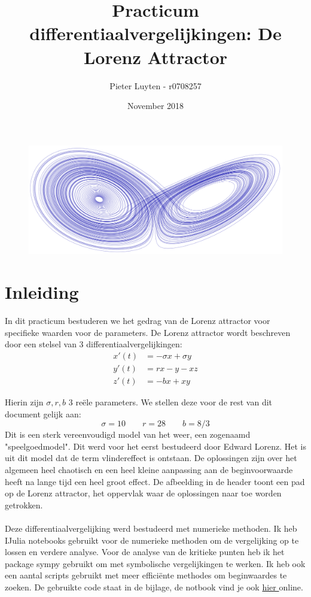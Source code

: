 \documentclass[12pt, a4paper]{article}
\title{Practicum differentiaalvergelijkingen: De Lorenz Attractor}
\author{Pieter Luyten - r0708257}
\date{November 2018}
\theoremstyle{definition}
\begin{document}
\maketitle

\begin{figure}[H]
    \centering
    \includegraphics[width=0.9\linewidth]{header_verslag.png}
\end{figure}

\section{Inleiding}
In dit practicum bestuderen we het gedrag van de Lorenz attractor voor specifieke waarden voor de parameters. De Lorenz attractor wordt beschreven door een stelsel van 3 differentiaalvergelijkingen:
\begin{align}
    x'(t) &= -\sigma x + \sigma y \nonumber \\
    y'(t) &= r x -y -xz \label{eq:stelses_lorenz}\\
    z'(t) &= -bx +xy \nonumber
\end{align}

Hierin zijn $\sigma, r, b$ 3 reële parameters. We stellen deze voor de rest van dit document gelijk aan:
$$\sigma = 10 \qquad r=28 \qquad b = 8/3$$
Dit is een sterk vereenvoudigd model van het weer, een zogenaamd "speelgoedmodel". Dit werd voor het eerst bestudeerd door Edward Lorenz. Het is uit dit model dat de term vlindereffect is ontstaan. De oplossingen zijn over het algemeen heel chaotisch en een heel kleine aanpassing aan de beginvoorwaarde heeft na lange tijd een heel groot effect. De afbeelding in de header toont een pad op de Lorenz attractor, het oppervlak waar de oplossingen naar toe worden getrokken.\\
\\
Deze differentiaalvergelijking werd bestudeerd met numerieke methoden. Ik heb IJulia notebooks gebruikt voor de numerieke methoden om de vergelijking op te lossen en verdere analyse. Voor de analyse van de kritieke punten heb ik het package sympy gebruikt om met symbolische vergelijkingen te werken. Ik heb ook een aantal scripts gebruikt met meer efficiënte methodes om beginwaardes te zoeken. De gebruikte code staat in de bijlage, de notbook vind je ook \href{https://nbviewer.jupyter.org/github/Cubedsheep/practicum-diff-Julia/blob/master/practicum%20-%20Julia.ipynb?fbclid=IwAR0w5uD6396VRiiF5jM1AxzXG7EB4HG5WAsDRnNsDRpx_s_2yaZP3bjLWWA}{hier
} online.
\end{document}
